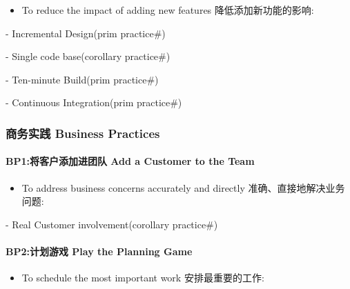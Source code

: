 \begin{itemize}
\tightlist
\item
  To reduce the impact of adding new features 降低添加新功能的影响:
\end{itemize}

\begin{description}
\tightlist
\item[]
- Incremental Design(prim practice\#)

- Single code base(corollary practice\#)

- Ten-minute Build(prim practice\#)

- Continuous Integration(prim practice\#)
\end{description}

\hypertarget{ux5546ux52a1ux5b9eux8df5-business-practices}{%
\subsubsection{商务实践 Business
Practices}\label{ux5546ux52a1ux5b9eux8df5-business-practices}}

\hypertarget{bp1ux5c06ux5ba2ux6237ux6dfbux52a0ux8fdbux56e2ux961f-add-a-customer-to-the-team}{%
\paragraph{BP1:将客户添加进团队 Add a Customer to the
Team}\label{bp1ux5c06ux5ba2ux6237ux6dfbux52a0ux8fdbux56e2ux961f-add-a-customer-to-the-team}}

\begin{itemize}
\tightlist
\item
  To address business concerns accurately and directly
  准确、直接地解决业务问题:
\end{itemize}

\begin{description}
\tightlist
\item[]
- Real Customer involvement(corollary practice\#)
\end{description}

\hypertarget{bp2ux8ba1ux5212ux6e38ux620f-play-the-planning-game}{%
\paragraph{BP2:计划游戏 Play the Planning
Game}\label{bp2ux8ba1ux5212ux6e38ux620f-play-the-planning-game}}

\begin{itemize}
\tightlist
\item
  To schedule the most important work 安排最重要的工作:\\
\end{itemize}

